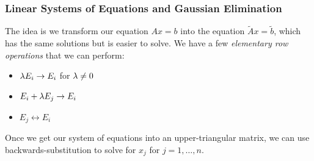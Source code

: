 \documentclass[class=article, crop=false]{standalone}
\begin{document}
  \subsubsection{Linear Systems of Equations and Gaussian Elimination}
  The idea is we transform our equation $Ax = b$ into the equation $\tilde Ax = \tilde b$, which has the same solutions but is easier to solve. We have a few \emph{elementary row operations} that we can perform:
  \begin{itemize}
    \item $\lambda E_i\to E_i$ for $\lambda\neq 0$
    \item $E_i + \lambda E_j\to E_i$
    \item $E_j \leftrightarrow E_i$
  \end{itemize}
  Once we get our system of equations into an upper-triangular matrix, we can use backwards-substitution to solve for $x_j$ for $j = 1,\dotsc,n$.
\end{document}
